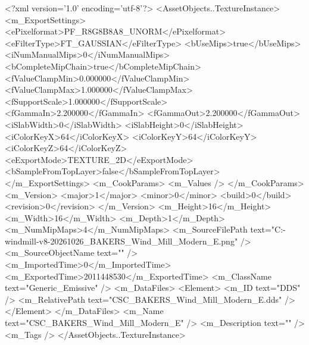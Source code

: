 <?xml version='1.0' encoding='utf-8'?>
<AssetObjects..TextureInstance>
  <m_ExportSettings>
    <ePixelformat>PF_R8G8B8A8_UNORM</ePixelformat>
    <eFilterType>FT_GAUSSIAN</eFilterType>
    <bUseMips>true</bUseMips>
    <iNumManualMips>0</iNumManualMips>
    <bCompleteMipChain>true</bCompleteMipChain>
    <fValueClampMin>0.000000</fValueClampMin>
    <fValueClampMax>1.000000</fValueClampMax>
    <fSupportScale>1.000000</fSupportScale>
    <fGammaIn>2.200000</fGammaIn>
    <fGammaOut>2.200000</fGammaOut>
    <iSlabWidth>0</iSlabWidth>
    <iSlabHeight>0</iSlabHeight>
    <iColorKeyX>64</iColorKeyX>
    <iColorKeyY>64</iColorKeyY>
    <iColorKeyZ>64</iColorKeyZ>
    <eExportMode>TEXTURE_2D</eExportMode>
    <bSampleFromTopLayer>false</bSampleFromTopLayer>
  </m_ExportSettings>
  <m_CookParams>
    <m_Values />
  </m_CookParams>
  <m_Version>
    <major>1</major>
    <minor>0</minor>
    <build>0</build>
    <revision>0</revision>
  </m_Version>
  <m_Height>16</m_Height>
  <m_Width>16</m_Width>
  <m_Depth>1</m_Depth>
  <m_NumMipMaps>4</m_NumMipMaps>
  <m_SourceFilePath text="C:\Users\Shadow\Desktop\Codex\modern-windmill-v8-20261026\export\textures\CSC_BAKERS_Wind_Mill_Modern_E.png" />
  <m_SourceObjectName text="" />
  <m_ImportedTime>0</m_ImportedTime>
  <m_ExportedTime>2011448530</m_ExportedTime>
  <m_ClassName text="Generic_Emissive" />
  <m_DataFiles>
    <Element>
      <m_ID text="DDS" />
      <m_RelativePath text="CSC_BAKERS_Wind_Mill_Modern_E.dds" />
    </Element>
  </m_DataFiles>
  <m_Name text="CSC_BAKERS_Wind_Mill_Modern_E" />
  <m_Description text="" />
  <m_Tags />
</AssetObjects..TextureInstance>